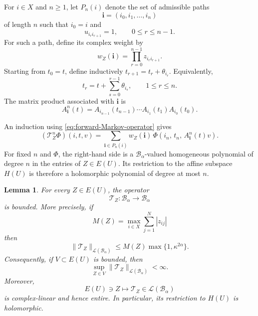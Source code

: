 \documentclass[11pt,a4paper]{amsart}
\newtheorem{lemma}[theorem]{Lemma}
\newcommand{\T}{\mathbb T}
\begin{document}
For \(i\in X\) and \(n\geq1\), let \(P_n(i)\) denote the
set of admissible paths
\[
 \mathbf i=(i_0,i_1,\ldots,i_n)
\]
of length \(n\) such that \(i_0=i\) and
\[
 u_{i_ri_{r+1}}=1,
 \qquad 0\leq r\leq n-1.
\]
For such a path, define its complex weight by
\begin{equation}\label{eq:complex-path-weight}
 w_Z(\mathbf i)
 =
 \prod_{r=0}^{n-1}z_{i_ri_{r+1}}.
\end{equation}
Starting from \(t_0=t\), define inductively $t_{r+1}=t_r+\theta_{i_r}$.
Equivalently,
\begin{equation}\label{eq:path-torus-points}
 t_r
 =
 t+\sum_{s=0}^{r-1}\theta_{i_s},
 \qquad 1\leq r\leq n.
\end{equation}
The matrix product associated with \(\mathbf i\) is
\begin{equation}\label{eq:path-matrix-product}
 A_{\mathbf i}^n(t)
 =
 A_{i_{n-1}}(t_{n-1})
 \cdots
 A_{i_1}(t_1)
 A_{i_0}(t_0).
\end{equation}

An induction using \eqref{eq:forward-Markov-operator} gives
\begin{equation}\label{eq:iterate-forward-Markov-operator}
 (\mathcal T_Z^n\Phi)(i,t, v)
 =
 \sum_{\mathbf i\in P_n(i)}
 w_Z(\mathbf i)\,
 \Phi\left(
 i_n,\,
 t_n,\,
 A_{\mathbf i}^n(t)v
 \right).
\end{equation}
For fixed \(n\) and \(\Phi\), the right-hand side is a
\(\mathcal B_\alpha\)-valued homogeneous polynomial of degree \(n\)
in the entries of \(Z\in E(U)\).  Its restriction to the affine
subspace \(H(U)\) is therefore a holomorphic polynomial of degree at
most \(n\).

\begin{lemma}\label{lem:operator-bounded}
For every \(Z\in E(U)\), the operator
\[
 \mathcal T_Z:\mathcal B_\alpha\longrightarrow\mathcal B_\alpha
\]
is bounded.  More precisely, if
\[
 M(Z)=\max_{i\in X}\sum_{j=1}^N|z_{ij}|
\]
then
\begin{equation}\label{eq:operator-norm-bound}
 \|\mathcal T_Z\|_{\mathcal L(\mathcal B_\alpha)}
 \leq
 M(Z)\max\{1,\kappa^{2\alpha}\}.
\end{equation}
Consequently, if \(V\subset E(U)\) is bounded, then
\[
 \sup_{Z\in V}
 \|\mathcal T_Z\|_{\mathcal L(\mathcal B_\alpha)}
 <\infty.
\]
Moreover,
\[
 E(U)\ni Z\longmapsto
 \mathcal T_Z\in\mathcal L(\mathcal B_\alpha)
\]
is complex-linear and hence entire.  In particular, its restriction
to \(H(U)\) is holomorphic.
\end{lemma}
\end{document}
